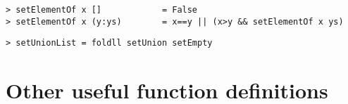 %
%
%
%
\begin{verbatim}
> setElementOf x []            = False
> setElementOf x (y:ys)        = x==y || (x>y && setElementOf x ys)
\end{verbatim}
%
%
\begin{verbatim}
> setUnionList = foldll setUnion setEmpty
\end{verbatim}
%
%
%
%
%
%
%
%
%
\section{Other useful function definitions}
\label{sect:util-funs}

